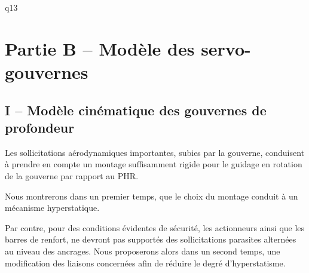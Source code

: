 \begin{multicols}{2}
{\begin{question}{q13}
\ifprof
\begin{corrige}
\end{corrige}
\else
\fi
\begin{reponses}



\end{reponses} \end{question}}   



\section*{Partie B -- Modèle des servo-gouvernes}
\subsection*{I -- Modèle cinématique des gouvernes de profondeur}

\begin{obj}
Les sollicitations aérodynamiques importantes, subies par la gouverne, conduisent à prendre
en compte un montage suffisamment rigide pour le guidage en rotation de la gouverne par rapport
au PHR.

Nous montrerons dans un premier temps, que le choix du montage conduit à un
mécanisme hyperstatique.

Par contre, pour des conditions évidentes de sécurité, les actionneurs ainsi que les barres de
renfort, ne devront pas supportés des sollicitations parasites alternées au niveau des ancrages.
Nous proposerons alors dans un second temps, une modification des liaisons
concernées afin de réduire le degré d’hyperstatisme.
\end{obj}


\end{multicols}
